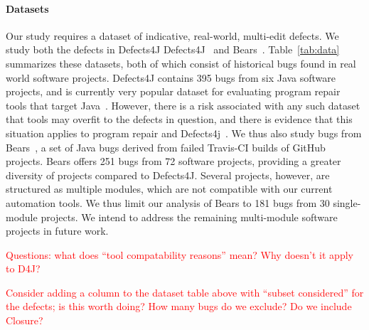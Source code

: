 \documentclass[sigconf, timestamp-false, anonymous=true]{acmart}
\newcommand\todo[1]{\textcolor{red}{#1}}
\begin{document}
\paragraph{Datasets}  Our study requires a dataset of indicative, real-world,
multi-edit defects.  We study both the defects in Defects4J
Defects4J~\cite{defects4j} and Bears~\cite{bears}.  Table~\ref{tab:data}
summarizes these datasets, both of which
consist of historical
bugs found in real world software projects. Defects4J contains 395 bugs from 
six Java software projects, and is currently very popular dataset for evaluating 
program repair tools that target Java~\cite{durieux-repair-them-all}.
However, there is a risk associated with any such dataset that tools may overfit
to the defects in question, and there is evidence that this situation applies to
program repair and Defects4j~\cite{durieux-repair-them-all}. 
We thus also study bugs from Bears~\cite{bears}, 
a set of Java bugs derived from failed Travis-CI builds of GitHub
projects. 
Bears offers 251 bugs from 72 software projects, providing a greater diversity of 
projects compared to Defects4J. Several projects, however, are structured as 
multiple modules, which are not compatible with our current automation tools.
We thus limit our analysis of Bears to 181 bugs from 30 single-module projects.
We intend to address the remaining multi-module software projects in future work.

\todo{Questions: what does ``tool compatability reasons'' mean?  Why doesn't it
  apply to D4J?}

\todo{Consider adding a column to the dataset table above with ``subset
  considered'' for the defects; is this worth doing?  How many bugs do we
  exclude? Do we include Closure?}
\end{document}
